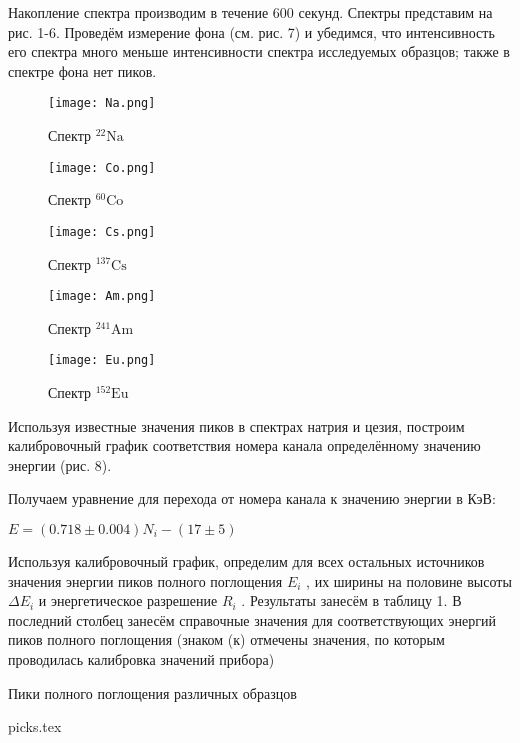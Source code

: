Накопление спектра производим в течение 600 секунд. Спектры представим на рис.
1-6. Проведём измерение фона (см. рис. 7) и убедимся, что интенсивность его
спектра много меньше интенсивности спектра исследуемых образцов; также в спектре
фона нет пиков.

\begin{figure}
\begin{center}
  \texttt{[image: Na.png]}
  \caption{Спектр ${}^{22}{\text{Na}}$}
  \texttt{[image: Co.png]}
  \caption{Спектр ${}^{60}{\text{Co}}$}
\end{center}
\end{figure}

\begin{figure}
\begin{center}
  \texttt{[image: Cs.png]}
  \caption{Спектр ${}^{137}{\text{Cs}}$}
  \texttt{[image: Am.png]}
  \caption{Спектр ${}^{241}{\text{Am}}$}
\end{center}
\end{figure}

\begin{figure}
\begin{center}
  \texttt{[image: Eu.png]}
  \caption{Спектр ${}^{152}{\text{Eu}}$}
\end{center}
\end{figure}

Используя известные значения пиков в спектрах натрия и цезия, построим
калибровочный график соответствия номера канала определённому значению энергии
(рис. 8).

Получаем уравнение для перехода от номера канала к значению энергии в КэВ:
\begin{center}
    $E = (0.718 \pm 0.004)N_i - (17 \pm 5)$
\end{center}

Используя калибровочный график, определим для всех остальных источников значения
энергии пиков полного поглощения $E_i$ , их ширины на половине высоты $\Delta
E_i$ и энергетическое разрешение $R_i$ . Результаты занесём в таблицу 1. В
последний столбец занесём справочные значения для соответствующих энергий пиков
полного поглощения (знаком (к) отмечены значения, по которым проводилась
калибровка значений прибора)

\begin{table}[h]
\begin{center}
  \caption{Пики полного поглощения различных образцов}
  \label{tab:my_label}
  {picks.tex}
\end{center}
\end{table}

